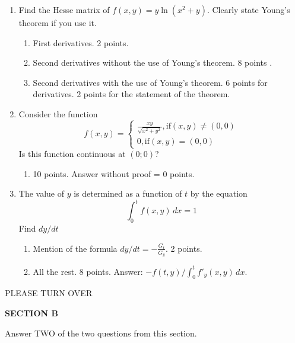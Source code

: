\documentclass[12pt]{article} %
\theoremstyle{definition} %
\begin{document}
\begin{enumerate}
\item Find the Hesse matrix of $f(x,y)=y\ln(x^2+y)$. Clearly state Young's theorem if you use it.

\begin{enumerate}
\item First derivatives. 2 points.
\item Second derivatives without the use of Young's theorem. 8 points .
\item Second derivatives with the use of Young's theorem. 6 points for derivatives. 2 points for the statement of the theorem.
\end{enumerate}



\item Consider the function
\begin{equation}
f(x,y)=
\begin{cases}
	\frac{xy}{\sqrt{x^2+y^2}}, \mbox{if} (x,y)\neq (0,0) \\
	0, \mbox{if} (x,y)=(0,0)
\end{cases}
\end{equation}
Is this function continuous at $(0;0)$?

\begin{enumerate}
\item 10 points. Answer without proof = 0 points.
\end{enumerate}


\item The value of $y$ is determined as a function of $t$ by the equation
\begin{equation}
\int_{0}^{t}f(x,y)\, dx=1
\end{equation}
Find $dy/dt$

\begin{enumerate}
\item Mention of the formula $dy/dt=-\frac{G_t}{G_y}$. 2 points.
\item All the rest. 8 points. Answer: $-f(t,y)/\int_0^tf'_y(x,y)\, dx$.
\end{enumerate}


\end{enumerate}

PLEASE TURN OVER

\textbf{SECTION B}

Answer TWO of the two questions from this section.
\end{document}
